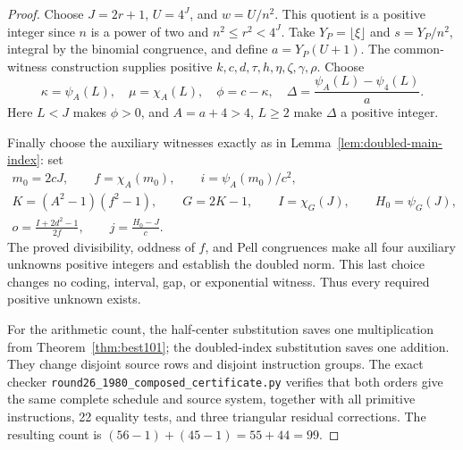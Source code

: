 \begin{proof}
Choose $J=2r+1$, $U=4^J$, and $w=U/n^2$. This quotient is a positive
integer since $n$ is a power of two and $n^2\le r^2<4^J$.
Take $Y_P=\lfloor\xi\rfloor$ and $s=Y_P/n^2$, integral by the
binomial congruence, and define $a=Y_P(U+1)$.
The common-witness construction supplies positive
$k,c,d,\tau,h,\eta,\zeta,\gamma,\rho$.
Choose
\[
 \kappa=\psi_A(L),\quad \mu=\chi_A(L),\quad
 \phi=c-\kappa,\quad
 \Delta=\frac{\psi_A(L)-\psi_4(L)}{a}.
\]
Here $L<J$ makes $\phi>0$, and $A=a+4>4$, $L\ge2$ make
$\Delta$ a positive integer.

Finally choose the auxiliary witnesses exactly as in
Lemma~\ref{lem:doubled-main-index}: set
\[
\begin{gathered}
 m_0=2cJ,\qquad f=\chi_A(m_0),\qquad
 i=\psi_A(m_0)/c^2,\\
 K=(A^2-1)(f^2-1),\qquad G=2K-1,\qquad
 I=\chi_G(J),\qquad H_0=\psi_G(J),\\
 o=\frac{I+2d^2-1}{2f},\qquad j=\frac{H_0-J}{c}.
\end{gathered}
\]
The proved divisibility, oddness of $f$, and Pell congruences make
all four auxiliary unknowns positive integers and establish the
doubled norm. This last choice changes no coding, interval, gap,
or exponential witness. Thus every required positive unknown exists.

For the arithmetic count, the half-center substitution saves one
multiplication from Theorem~\ref{thm:best101}; the doubled-index
substitution saves one addition. They change disjoint source rows and
disjoint instruction groups. The exact checker
\texttt{round26\_1980\_composed\_certificate.py} verifies that both
orders give the same complete schedule and source system, together
with all primitive instructions, 22 equality tests, and three
triangular residual corrections. The resulting count is
$(56-1)+(45-1)=55+44=99$.
\end{proof}
